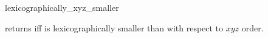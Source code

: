 \begin{ccRefFunction}{lexicographically_xyz_smaller}

{returns  iff  is lexicographically smaller
than  with respect to $xyz$ order.}
\end{ccRefFunction}

